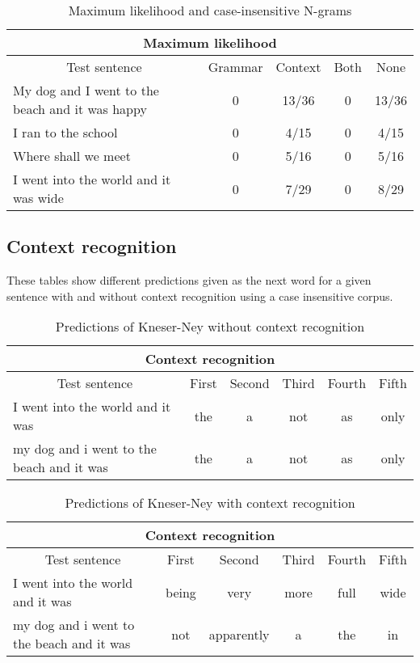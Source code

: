 \vspace{-1cm}
\begin{table}[H]
\centering
\caption{Maximum likelihood and case-insensitive N-grams}
{\scriptsize
\begin{tabular}{ |p{}|c|c|c|c| }
	\hline
	\multicolumn{5}{|c|}{Maximum likelihood} \\
	\hline
	\multicolumn{1}{|c|}{Test sentence} & Grammar & Context & Both & None \\
	\hline
	My dog and I went to the beach and it was happy & 0 & 13/36 & 0 &13/36 \\
	\hline
	I ran to the school & 0 & 4/15 & 0 & 4/15 \\
	\hline
	Where shall we meet & 0 & 5/16 & 0 & 5/16 \\
	\hline
	I went into the world and it was wide & 0 & 7/29 & 0 & 8/29 \\
	\hline
\end{tabular}
}
\end{table}

\subsection{Context recognition}
These tables show different predictions given as the next word for a given sentence with and without context recognition using a case insensitive corpus.

\vspace{-0.5cm}
\begin{table}[H]
\centering
\caption{Predictions of Kneser-Ney without context recognition}
{\scriptsize
\begin{tabular}{ |p{}|c|c|c|c|c| }
	\hline
	\multicolumn{6}{|c|}{Context recognition} \\
	\hline
	\multicolumn{1}{|c|}{Test sentence} & First & Second & Third & Fourth & Fifth\\
	\hline
	I went into the world and it was & the & a & not & as & only \\
	\hline
	my dog and i went to the beach and it was & the & a & not & as & only \\
	\hline
\end{tabular}
}
\end{table}

\vspace{-1cm}
\begin{table}[H]
\centering
\caption{Predictions of Kneser-Ney with context recognition}
{\scriptsize
\begin{tabular}{ |p{}|c|c|c|c|c| }
	\hline
	\multicolumn{6}{|c|}{Context recognition} \\
	\hline
	\multicolumn{1}{|c|}{Test sentence} & First & Second & Third & Fourth & Fifth\\
	\hline
	I went into the world and it was & being & very & more & full & wide \\
	\hline
	my dog and i went to the beach and it was & not & apparently & a & the & in \\
	\hline
\end{tabular}
}
\end{table}

